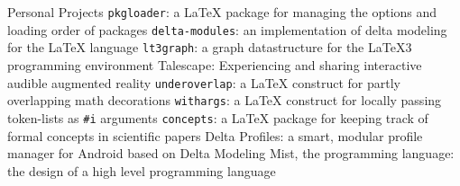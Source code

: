 
\begin{rubric}{Personal Projects}
		\verb|pkgloader|: a \LaTeX{} package for managing the options and loading order of packages
		\hfill{}
		\verb|delta-modules|: an implementation of delta modeling for the \LaTeX{} language
		\hfill\emptywww
		\verb|lt3graph|: a graph datastructure for the \LaTeX3 programming environment
		\hfill{}
		Talescape: Experiencing and sharing interactive audible augmented reality
		\hfill{}
		\verb|underoverlap|: a \LaTeX{} construct for partly overlapping math decorations
		\hfill{}
		\verb|withargs|: a \LaTeX{} construct for locally passing token-lists as \verb~#i~ arguments
		\hfill{}
		\verb|concepts|: a \LaTeX{} package for keeping track of formal concepts in scientific papers
		\hfill{}
		Delta Profiles: a smart, modular profile manager for Android based on Delta Modeling
		\hfill{}
		Mist, the programming language: the design of a high level programming language
		\hfill{}
\end{rubric}
